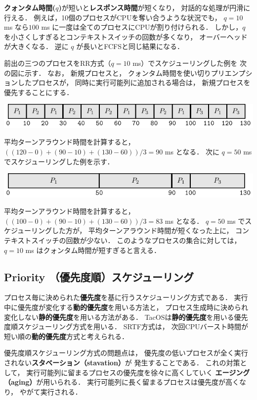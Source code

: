 {\bf クォンタム時間($q$)}が短いと{\bf レスポンス時間}が短くなり，
対話的な処理が円滑に行える．
例えば，10個のプロセスがCPUを奪い合うような状況でも，
$q = 10$ ms なら$100$ ms に一度は全てのプロセスにCPUが割り付けられる．
しかし，$q$ を小さくしすぎるとコンテキストスイッチの回数が多くなり，
オーバーヘッドが大きくなる．
逆に $q$ が長いとFCFSと同じ結果になる．

前出の三つのプロセスをRR方式（$q = 10$ ms）でスケジューリングした例を
次の図に示す．
なお，
新規プロセスと，
クォンタム時間を使い切りプリエンプションしたプロセスが，
同時に実行可能列に追加される場合は，
新規プロセスを優先することにする．

\begin{center}
\includegraphics[scale=1.0]{GanntChart/rr1.pdf}
\end{center}

平均ターンアラウンド時間を計算すると，
$((120-0)+(90-10)+(130-60))/3=90$ ms となる．
次に $q = 50$ ms でスケジューリングした例を示す．

\begin{center}
\includegraphics[scale=1.0]{GanntChart/rr2.pdf}
\end{center}

平均ターンアラウンド時間を計算すると，
$((100-0)+(90-10)+(130-60))/3=83$ ms となる．
$q = 50$ ms でスケジューリングした方が，
平均ターンアラウンド時間が短くなった上に，
コンテキストスイッチの回数が少ない．
このようなプロセスの集合に対しては，
$q = 10$ ms はクォンタム時間が短すぎると言える．

\subsection{Priority （優先度順）スケジューリング}
プロセス毎に決められた{\bf 優先度}を基に行うスケジューリング方式である．
実行中に優先度が変化する{\bf 動的優先度}を用いる方法と，
プロセス生成時に決められ変化しない{\bf 静的優先度}を用いる方法がある．
TacOSは{\bf 静的優先度}を用いる優先度順スケジューリング方式を用いる．
SRTF方式は，
次回CPUバースト時間が短い順の{\bf 動的優先度}方式と考えられる．

優先度順スケジューリング方式の問題点は，
優先度の低いプロセスが全く実行されない{\bf スタベーション（stavation）}が
発生することである．
これの対策として，
実行可能列に留まるプロセスの優先度を徐々に高くしていく
{\bf エージング（aging）}が用いられる．
実行可能列に長く留まるプロセスは優先度が高くなり，
やがて実行される．

